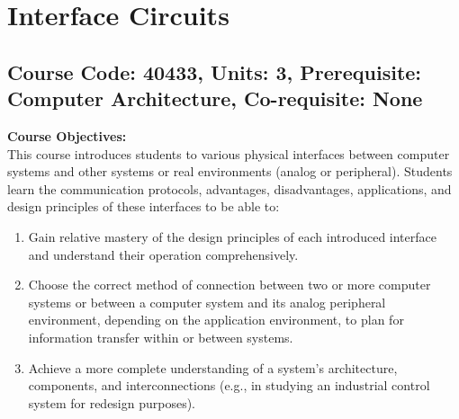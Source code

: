 \documentclass[12pt]{article}
\begin{document}
\newpage

\section{Interface Circuits}
\subsection*{Course Code: 40433, Units: 3, Prerequisite: Computer Architecture, Co-requisite: None}

\textbf{Course Objectives:} \\
This course introduces students to various physical interfaces between computer systems and other systems or real environments (analog or peripheral). Students learn the communication protocols, advantages, disadvantages, applications, and design principles of these interfaces to be able to:
\begin{enumerate}
    \item Gain relative mastery of the design principles of each introduced interface and understand their operation comprehensively.
    \item Choose the correct method of connection between two or more computer systems or between a computer system and its analog peripheral environment, depending on the application environment, to plan for information transfer within or between systems.
    \item Achieve a more complete understanding of a system's architecture, components, and interconnections (e.g., in studying an industrial control system for redesign purposes).
\end{enumerate}
\end{document}
